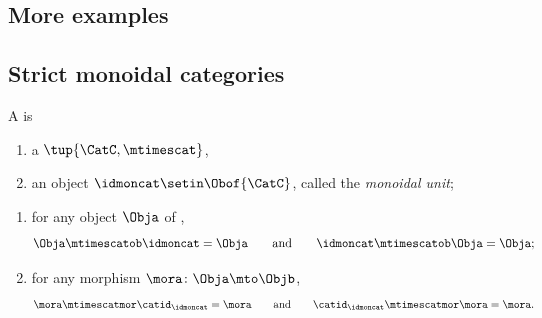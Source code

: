
\subsection{More examples}


\subsection{Strict monoidal categories}

\begin{ctdefinition}
    \label{def:strict-monoidal-cat}
    A  is

    \constit

    \begin{enumerate}
        \item a  $\tup{\CatC, \mtimescat}$,
        \item an object $\idmoncat \setin \Obof{\CatC}$, called the \emph{monoidal unit};
    \end{enumerate}

    \condit

    \begin{enumerate}
        \item for any object $\Obja$ of \CatC,
              \begin{equation}\label{eq:strict-mon-stacking-cat-cond1}
                  \Obja \mtimescatob \idmoncat = \Obja \qquad \text{and} \qquad \idmoncat \mtimescatob \Obja = \Obja;
              \end{equation}
        \item for any morphism $\mora \colon \Obja \mto \Objb$,
              \begin{equation}\label{eq:strict-mon-stacking-cat-cond2}
                  \mora \mtimescatmor \catid_\idmoncat = \mora \qquad \text{and} \qquad \catid_\idmoncat \mtimescatmor  \mora = \mora.
              \end{equation}
    \end{enumerate}
\end{ctdefinition}



